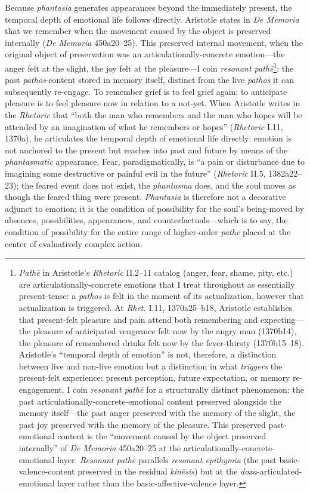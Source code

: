 \documentclass{article}
\begin{document}
Because \textit{phantasia} generates appearances beyond the immediately present, the temporal depth of emotional life follows directly. Aristotle states in \textit{De Memoria} that we remember when the movement caused by the object is preserved internally (\textit{De Memoria} 450a20--25). This preserved internal movement, when the original object of preservation was an articulationally-concrete emotion---the anger felt at the slight, the joy felt at the pleasure---I coin \textit{resonant pathē}\footnote{\textit{Pathē} in Aristotle's \textit{Rhetoric} II.2--11 catalog (anger, fear, shame, pity, etc.) are articulationally-concrete emotions that I treat throughout as essentially present-tense: a \textit{pathos} is felt in the moment of its actualization, however that actualization is triggered. At \textit{Rhet.} I.11, 1370a25--b18, Aristotle establishes that present-felt pleasure and pain attend both remembering and expecting---the pleasure of anticipated vengeance felt now by the angry man (1370b14), the pleasure of remembered drinks felt now by the fever-thirsty (1370b15--18). Aristotle's ``temporal depth of emotion'' is not, therefore, a distinction between live and non-live emotion but a distinction in what \textit{triggers} the present-felt experience: present perception, future expectation, or memory re-engagement. I coin \textit{resonant pathē} for a structurally distinct phenomenon: the past articulationally-concrete-emotional content preserved alongside the memory itself---the past anger preserved with the memory of the slight, the past joy preserved with the memory of the pleasure. This preserved past-emotional content is the ``movement caused by the object preserved internally'' of \textit{De Memoria} 450a20--25 at the articulationally-concrete-emotional layer. \textit{Resonant pathē} parallels \textit{resonant epithymia} (the past basic-valence-content preserved in the residual \textit{kinēsis}) but at the \textit{doxa}-articulated-emotional layer rather than the basic-affective-valence layer.}: the past \textit{pathos}-content stored in memory itself, distinct from the live \textit{pathos} it can subsequently re-engage. To remember grief is to feel grief again; to anticipate pleasure is to feel pleasure now in relation to a not-yet. When Aristotle writes in the \textit{Rhetoric} that ``both the man who remembers and the man who hopes will be attended by an imagination of what he remembers or hopes'' (\textit{Rhetoric} I.11, 1370a), he articulates the temporal depth of emotional life directly: emotion is not anchored to the present but reaches into past and future by means of the \textit{phantasmatic} appearance. Fear, paradigmatically, is ``a pain or disturbance due to imagining some destructive or painful evil in the future'' (\textit{Rhetoric} II.5, 1382a22--23); the feared event does not exist, the \textit{phantasma} does, and the soul moves as though the feared thing were present. \textit{Phantasia} is therefore not a decorative adjunct to emotion; it is the condition of possibility for the soul's being-moved by absences, possibilities, appearances, and counterfactuals---which is to say, the condition of possibility for the entire range of higher-order \textit{pathē} placed at the center of evaluatively complex action.
\end{document}
